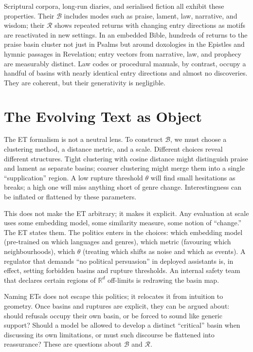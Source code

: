 \documentclass[12pt,a4paper]{article}
\begin{document}
Scriptural corpora, long-run diaries, and serialised fiction all exhibit these properties. Their $\mathcal{B}$ includes modes such as praise, lament, law, narrative, and wisdom; their $\mathcal{R}$ shows repeated returns with changing entry directions as motifs are reactivated in new settings. In an embedded Bible, hundreds of returns to the praise basin cluster not just in Psalms but around doxologies in the Epistles and hymnic passages in Revelation; entry vectors from narrative, law, and prophecy are measurably distinct. Law codes or procedural manuals, by contrast, occupy a handful of basins with nearly identical entry directions and almost no discoveries. They are coherent, but their generativity is negligible.

\section{The Evolving Text as Object}

The ET formalism is not a neutral lens. To construct $\mathcal{B}$, we must choose a clustering method, a distance metric, and a scale. Different choices reveal different structures. Tight clustering with cosine distance might distinguish praise and lament as separate basins; coarser clustering might merge them into a single ``supplication'' region. A low rupture threshold $\theta$ will find small hesitations as breaks; a high one will miss anything short of genre change. Interestingness can be inflated or flattened by these parameters.

This does not make the ET arbitrary; it makes it explicit. Any evaluation at scale uses some embedding model, some similarity measure, some notion of ``change.'' The ET states them. The politics enters in the choices: which embedding model (pre-trained on which languages and genres), which metric (favouring which neighbourhoods), which $\theta$ (treating which shifts as noise and which as events). A regulator that demands ``no political persuasion'' in deployed assistants is, in effect, setting forbidden basins and rupture thresholds. An internal safety team that declares certain regions of $\mathbb{R}^d$ off-limits is redrawing the basin map.

Naming ETs does not escape this politics; it relocates it from intuition to geometry. Once basins and ruptures are explicit, they can be argued about: should refusals occupy their own basin, or be forced to sound like generic support? Should a model be allowed to develop a distinct ``critical'' basin when discussing its own limitations, or must such discourse be flattened into reassurance? These are questions about $\mathcal{B}$ and $\mathcal{R}$.
\end{document}
